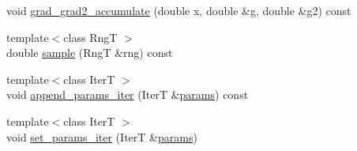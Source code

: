 \begin{DoxyCompactItemize}
void \hyperlink{classprior__hessian_1_1NormalDist_a8c28e95235a2def2e86c299e4ebe8afb}{grad\+\_\+grad2\+\_\+accumulate} (double x, double \&g, double \&g2) const 
\item 
{\footnotesize template$<$class RngT $>$ }\\double \hyperlink{classprior__hessian_1_1NormalDist_a1f75e2644054b23d804b7be394ed5a2b}{sample} (RngT \&rng) const 
\item 
{\footnotesize template$<$class IterT $>$ }\\void \hyperlink{classprior__hessian_1_1NormalDist_abf71571c6e5ed7c496f8a5ff556d998c}{append\+\_\+params\+\_\+iter} (IterT \&\hyperlink{classprior__hessian_1_1NormalDist_aaea8964b1f62318c047e3c75ac104436}{params}) const 
\item 
{\footnotesize template$<$class IterT $>$ }\\void \hyperlink{classprior__hessian_1_1NormalDist_a78eea7f027f4dc2024adc00f7cb8cce1}{set\+\_\+params\+\_\+iter} (IterT \&\hyperlink{classprior__hessian_1_1NormalDist_aaea8964b1f62318c047e3c75ac104436}{params})
\end{DoxyCompactItemize}

